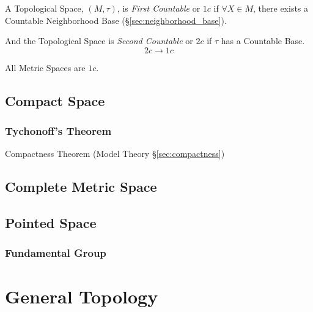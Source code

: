 A Topological Space, $(M,\tau)$, is \emph{First Countable} or $1c$ if
$\forall X \in M$, there exists a Countable Neighborhood Base
(\S\ref{sec:neighborhood_base}).

And the Topological Space is \emph{Second Countable} or $2c$ if $\tau$
has a Countable Base.
\[
  2c \rightarrow 1c
\]

All Metric Spaces are $1c$.



\subsection{Compact Space}\label{sec:compact_space}

\subsubsection{Tychonoff's Theorem}\label{sec:tychonoffs_theorem}

Compactness Theorem (Model Theory \S\ref{sec:compactness})



\subsection{Complete Metric Space}\label{sec:complete_metricspace}

\subsection{Pointed Space}\label{sec:pointed_space}

\subsubsection{Fundamental Group}\label{sec:fundamental_group}



\section{General Topology}\label{sec:general_topology}

